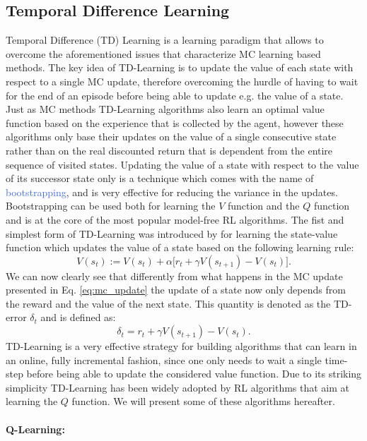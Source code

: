 \subsection{Temporal Difference Learning}
Temporal Difference (TD) Learning is a learning paradigm that allows to overcome the aforementioned issues that characterize MC learning based methods. The key idea of TD-Learning is to update the value of each state with respect to a single MC update, therefore overcoming the hurdle of having to wait for the end of an episode before being able to update e.g. the value of a state. Just as MC methods TD-Learning algorithms also learn an optimal value function based on the experience that is collected by the agent, however these algorithms only base their updates on the value of a single consecutive state rather than on the real discounted return that is dependent from the entire sequence of visited states. Updating the value of a state with respect to the value of its successor state only is a technique which comes with the name of \textcolor{RoyalBlue}{bootstrapping}, and is very effective for reducing the variance in the updates. Bootstrapping can be used both for learning the $V$ function and the $Q$ function and is at the core of the most popular model-free RL algorithms. The fist and simplest form of TD-Learning was introduced by for learning the state-value function which updates the value of a state based on the following learning rule:
\begin{equation}
	V(s_t):= V(s_t) + \alpha \big[r_t + \gamma V(s_{t+1}) - V(s_t)\big].
\end{equation}
We can now clearly see that differently from what happens in the MC update presented in Eq. \ref{eq:mc_update} the update of a state now only depends from the reward and the value of the next state. This quantity is denoted as the TD-error $\delta_t$ and is defined as:
\begin{equation}
	\delta_t = r_t + \gamma V(s_{t+1}) - V(s_t).
\end{equation}
TD-Learning is a very effective strategy for building algorithms that can learn in an online, fully incremental fashion, since one only needs to wait a single time-step before being able to update the considered value function. Due to its striking simplicity TD-Learning has been widely adopted by RL algorithms that aim at learning the $Q$ function. We will present some of these algorithms hereafter. 

\paragraph{Q-Learning:}

